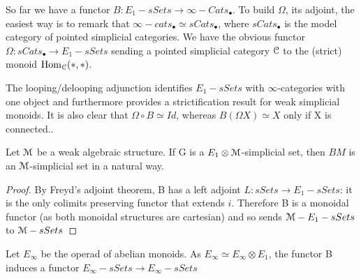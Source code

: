 \begin{refsection}
\begin{remark}
So far we have a functor $B:E_1-sSets\to \infty-Cats_{\bullet}$. To build $\Omega$, its adjoint, the easiest way is to remark that $\infty-cats_{\bullet}\simeq sCats_{\bullet}$,
 where $sCats_{\bullet}$ is the model category of pointed simplicial categories. We have the obvious functor $\Omega: sCats_{\bullet}\to E_1-sSets$ sending a
pointed simplicial category $\mathcal{C}$ to the (strict) monoid $\mathrm{Hom}_{\mathcal{C}}(*,*)$.
\end{remark}

The looping/delooping adjunction identifies $E_1-sSets$ with $\infty$-categories with one object and furthermore provides a strictification result for weak simplicial
monoids. It is also clear that $\Omega \circ B\simeq Id$, whereas $B(\Omega X)\simeq X$ only if X is connected..

\begin{proposition} Let $\mathcal{M}$ be a weak algebraic structure.
If G is a $E_1\otimes \mathcal{M}$-simplicial set, then $BM$ is an $\mathcal{M}$-simplicial set in a natural way.
\end{proposition}

\begin{proof}
By Freyd's adjoint theorem, B has a left adjoint $L:sSets\to E_1-sSets$: it is the only colimits preserving functor that extends $i$.
Therefore B is a monoidal functor (as both monoidal structures are cartesian) and so sends $\mathcal{M}-E_1-sSets$ to $\mathcal{M}-sSets$
\end{proof}

\begin{corollary}
Let $E_{\infty}$ be the operad of abelian monoids. As $E_{\infty}\simeq E_{\infty}\otimes E_1$, the functor B induces a functor $E_{\infty}-sSets\to E_{\infty}-sSets$
\end{corollary}

\printbibliography[heading = local]

\end{refsection}
